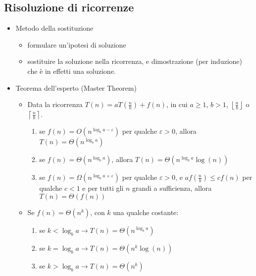 \documentclass[10pt,a4paper]{article}
\begin{document}
\subsection*{Risoluzione di ricorrenze}
\begin{itemize}
    \item Metodo della sostituzione \begin{itemize}
        \item formulare un'ipotesi di soluzione
        \item sostituire la soluzione nella ricorrenza, e dimostrazione (per induzione) che \`e in effetti una soluzione.
    \end{itemize}
    \item Teorema dell'esperto (Master Theorem) \begin{itemize}
        \item Data la ricorrenza $T(n) = aT(\frac{n}{b}) + f(n)$, in cui $a\ge1$, $b>1$, $\left\lfloor\frac{n}{b}\right\rfloor$ o $\left\lceil\frac{n}{b}\right\rceil$.
        \begin{enumerate}
            \item se $f(n) = O\left(n^{\log_ba-\varepsilon}\right)$ per qualche $\varepsilon>0$, allora $T(n)=\varTheta\left(n^{\log_ba}\right)$
            \item se $f(n) = \varTheta\left(n^{\log_ba}\right)$, allora $T(n)=\varTheta\left(n^{\log_ba}\log(n)\right)$
            \item se $f(n) = \varOmega\left(n^{\log_ba+\varepsilon}\right)$ per qualche $\varepsilon>0$, e $af\left(\frac{n}{b}\right)\le cf(n)$ per qualche $c<1$ e per tutti gli $n$ grandi a sufficienza, allora $T(n)=\varTheta(f(n))$
        \end{enumerate}
        \item Se $f(n) = \varTheta\left(n^k\right)$, con $k$ una qualche costante:
        \begin{enumerate}
            \item se $k < \log_ba \rightarrow T(n) = \varTheta\left(n^{\log_ba}\right)$
            \item se $k = \log_ba \rightarrow T(n) = \varTheta\left(n^k\log(n)\right)$
            \item se $k > \log_ba \rightarrow T(n) = \varTheta\left(n^k\right)$
        \end{enumerate}
    \end{itemize}
\end{itemize}
\end{document}
